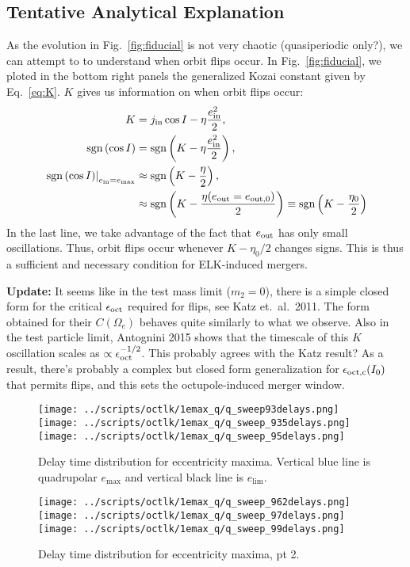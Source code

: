 \documentclass[11pt,
        usenames, %
        dvipsnames %
    ]{article}
\newcommand*{\at}[1]{\left.#1\right|}
\newcommand*{\p}[1]{\left(#1\right)}
\DeclareMathOperator{\sgn}{sgn}
\begin{document}
\subsection{Tentative Analytical Explanation}

As the evolution in Fig.~\ref{fig:fiducial} is not very chaotic (quasiperiodic
only?), we can attempt to to understand when orbit flips occur. In
Fig.~\ref{fig:fiducial}, we ploted in the bottom right panels the generalized
Kozai constant given by Eq.~\eqref{eq:K}. $K$ gives us information on when orbit
flips occur:
\begin{align}
    K &= j_{\rm in}\cos I - \eta \frac{e_{\rm in}^2}{2},\\
    \sgn\p{\cos I} &= \sgn\p{K - \eta \frac{e_{\rm in}^2}{2}},\\
    \at{\sgn\p{\cos I}}_{e_{\rm in} = e_{\max}}
        &\approx \sgn\p{K - \frac{\eta}{2}},\nonumber\\
        &\approx \sgn\p{K - \frac{\eta(e_{\rm out} = e_{\rm out, 0})}{2}}
        \equiv \sgn\p{K - \frac{\eta_0}{2}}
\end{align}
In the last line, we take advantage of the fact that $e_{\rm out}$ has only
small oscillations. Thus, orbit flips occur whenever $K - \eta_0/2$ changes
signs. This is thus a sufficient and necessary condition for ELK-induced
mergers.

\textbf{Update:} It seems like in the test mass limit ($m_2 = 0$), there is a
simple closed form for the critical $\epsilon_{\rm oct}$ required for flips, see
Katz et.\ al.\ 2011. The form obtained for their $C(\Omega_e)$ behaves quite
similarly to what we observe. Also in the test particle limit, Antognini 2015
shows that the timescale of this $K$ oscillation scales as $\propto
\epsilon_{\rm oct}^{-1/2}$. This probably agrees with the Katz result? As a
result, there's probably a complex but closed form generalization for
$\epsilon_{\rm oct, c}(I_0)$ that permits flips, and this sets the
octupole-induced merger window.

\begin{figure}
    \centering
    \texttt{[image: ../scripts/octlk/1emax\_q/q\_sweep93delays.png]}
    \texttt{[image: ../scripts/octlk/1emax\_q/q\_sweep\_935delays.png]}
    \texttt{[image: ../scripts/octlk/1emax\_q/q\_sweep\_95delays.png]}
    \caption{Delay time distribution for eccentricity maxima. Vertical blue line
    is quadrupolar $e_{\max}$ and vertical black line is $e_{\lim}$.}\label{fig:delays}
\end{figure}
\begin{figure}
    \centering
    \texttt{[image: ../scripts/octlk/1emax\_q/q\_sweep\_962delays.png]}
    \texttt{[image: ../scripts/octlk/1emax\_q/q\_sweep\_97delays.png]}
    \texttt{[image: ../scripts/octlk/1emax\_q/q\_sweep\_99delays.png]}
    \caption{Delay time distribution for eccentricity maxima, pt 2.}\label{fig:delays2}
\end{figure}
\end{document}
